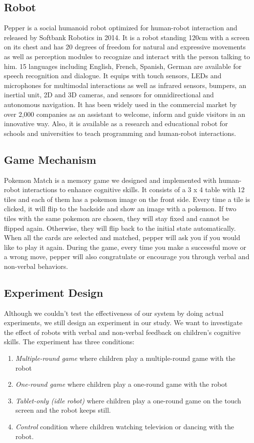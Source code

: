 \documentclass[a4paper, 12pt]{article}
\begin{document}
\subsection{Robot}
Pepper is a social humanoid robot optimized for human-robot interaction and released by Softbank Robotics in 2014. It is a robot standing 120cm with a screen on its chest and has 20 degrees of freedom for natural and expressive movements as well as perception modules to recognize and interact with the person talking to him. 15 languages including English, French, Spanish, German are available  for speech recognition and dialogue. It equips with touch sensors, LEDs and microphones for multimodal interactions as well as infrared sensors, bumpers, an inertial unit, 2D and 3D cameras, and sensors for omnidirectional and autonomous navigation. It has been widely used in the commercial market by over 2,000 companies as an assistant to welcome, inform and guide visitors in an innovative way. Also, it is available as a research and educational robot for schools and universities to teach programming and human-robot interactions. 

\subsection{Game Mechanism}
Pokemon Match is a memory game we designed and implemented with human-robot interactions to enhance cognitive skills. It consists of a 3 x 4 table with 12 tiles and each of them has a pokemon image on the front side. Every time a tile is clicked, it will flip to the backside and show an image with a pokemon. If two tiles with the same pokemon are chosen, they will stay fixed and cannot be flipped again. Otherwise, they will flip back to the initial state automatically. When all the cards are selected and matched, pepper will ask you if you would like to play it again. During the game, every time you make a successful move or a wrong move, pepper will also congratulate or encourage you through verbal and non-verbal behaviors.

\subsection{Experiment Design}
Although we couldn't test the effectiveness of our system by doing actual experiments, we still design an experiment in our study. We want to investigate the effect of robots with verbal and non-verbal feedback on children's cognitive skills. The experiment has three conditions:
\begin{enumerate}
\item \textit{Multiple-round game} where children play a multiple-round game with the robot
\item \textit{One-round game} where children play a one-round game with the robot
\item \textit{Tablet-only (idle robot)} where children play a one-round game on the touch screen and the robot keeps still.
\item \textit{Control} condition where children watching television or dancing with the robot.
\end{enumerate}
\end{document}
